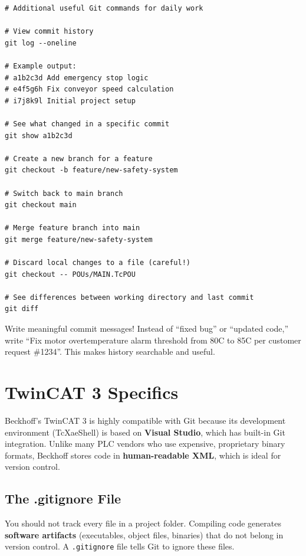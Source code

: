 \documentclass[11pt,a4paper]{article}
\begin{document}
\begin{lstlisting}[style=bashstyle]
# Additional useful Git commands for daily work

# View commit history
git log --oneline

# Example output:
# a1b2c3d Add emergency stop logic
# e4f5g6h Fix conveyor speed calculation
# i7j8k9l Initial project setup

# See what changed in a specific commit
git show a1b2c3d

# Create a new branch for a feature
git checkout -b feature/new-safety-system

# Switch back to main branch
git checkout main

# Merge feature branch into main
git merge feature/new-safety-system

# Discard local changes to a file (careful!)
git checkout -- POUs/MAIN.TcPOU

# See differences between working directory and last commit
git diff
\end{lstlisting}

\begin{tipbox}
Write meaningful commit messages! Instead of ``fixed bug'' or ``updated code,'' write ``Fix motor overtemperature alarm threshold from 80C to 85C per customer request \#1234''. This makes history searchable and useful.
\end{tipbox}

\section{TwinCAT 3 Specifics}

Beckhoff's TwinCAT 3 is highly compatible with Git because its development environment (TcXaeShell) is based on \textbf{Visual Studio}, which has built-in Git integration. Unlike many PLC vendors who use expensive, proprietary binary formats, Beckhoff stores code in \textbf{human-readable XML}, which is ideal for version control.

\subsection{The .gitignore File}

You should not track every file in a project folder. Compiling code generates \textbf{software artifacts} (executables, object files, binaries) that do not belong in version control. A \texttt{.gitignore} file tells Git to ignore these files.
\end{document}
